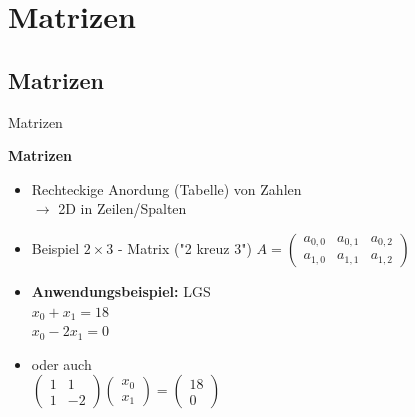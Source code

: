 \documentclass[10pt,aspectratio=169]{beamer}
\begin{document}
  \section{Matrizen}

  \subsection{Matrizen}
  \begin{frame}{Matrizen}
    \begin{minipage}{9cm}
      \textbf{Matrizen}
      \begin{itemize}
        \item Rechteckige Anordung (Tabelle) von Zahlen\\ $\rightarrow$ 2D in Zeilen/Spalten
        \item Beispiel $2 \times 3$ - Matrix ("2 kreuz 3")
        \vspace{0.2cm}
        $A = \begin{pmatrix} a_{0,0} & a_{0,1} & a_{0,2}\\ a_{1,0} & a_{1,1} &  a_{1,2}\end{pmatrix}$
        \vspace{0.2cm}
        \item \textbf{Anwendungsbeispiel:} LGS\\
          $x_0 + x_1 = 18$\\
          $x_0 -2x_1 = 0$
        \item oder auch\\
        \vspace{0.2cm}
        $\begin{pmatrix}
          1 & 1\\1 & -2
        \end{pmatrix}
        \begin{pmatrix}x_0\\x_1\end{pmatrix} = \begin{pmatrix}18\\0\end{pmatrix}$
        

\end{itemize}
\end{minipage}
\end{frame}
\end{document}
